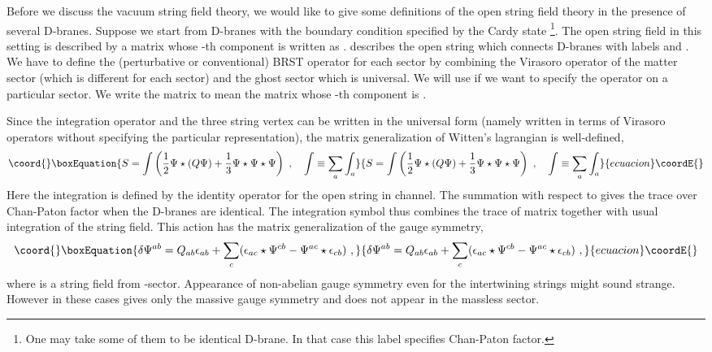 \documentclass[a4paper,12pt]{article}
\begin{document}
Before we discuss the vacuum string field theory, we would
like to give some definitions of the open string field theory
in the presence of several D-branes.  
Suppose we start from \coordHE{} D-branes with the boundary condition
specified by the Cardy  state \coordHE{}  \coordHE{}\footnote{
One may take some of them to be identical D-brane. In that case
this label specifies Chan-Paton factor.}.
The open string field in this setting is described by
a \coordHE{} matrix \myHighlight{$\Psi$}\coordHE{} whose \coordHE{}-th component is
written as \coordHE{}. \coordHE{} describes the 
open string which connects D-branes  with labels \coordHE{} and \coordHE{}.
We have to define the (perturbative or conventional)
BRST operator \coordHE{} for each sector by combining the Virasoro operator
of the matter sector (which is different 
for each sector) and the ghost sector which is universal.
We will use \coordHE{} if we want to specify the operator
on a particular sector. We write the matrix \coordHE{} 
to mean the matrix whose \coordHE{}-th component is
\coordHE{}.

Since the integration operator and the three string vertex 
can be written in the universal form \cite{r-RZ} 
(namely written in terms of Virasoro operators without 
specifying the particular  representation), the matrix
generalization of Witten's lagrangian is well-defined,
\begin{equation}\coord{}\boxEquation{
 S=\int \left(\frac{1}{2}\Psi \star(Q \Psi) + 
\frac{1}{3} \Psi\star\Psi\star\Psi
\right)\,\,,\quad
\int\equiv \sum_a \int_a
}{
 S=\int \left(\frac{1}{2}\Psi \star(Q \Psi) + 
\frac{1}{3} \Psi\star\Psi\star\Psi
\right)\,\,,\quad
\int\equiv \sum_a \int_a
}{ecuacion}\coordE{}\end{equation}
Here the integration \coordHE{}
is defined by the identity operator for the open string
in \coordHE{} channel. The summation with respect to 
\coordHE{} gives the trace over Chan-Paton factor
when the D-branes are identical. 
The integration symbol \myHighlight{$\int$}\coordHE{} thus combines the trace of
matrix together with usual integration of the string field.
This action has the matrix generalization of the gauge symmetry,
\begin{equation}\coord{}\boxEquation{
 \delta \Psi^{ab}=Q_{ab} \epsilon_{ab} 
 + \sum_c (\epsilon_{ac}\star \Psi^{cb}-
\Psi^{ac}\star\epsilon_{cb})\,\,,
}{
 \delta \Psi^{ab}=Q_{ab} \epsilon_{ab} 
 + \sum_c (\epsilon_{ac}\star \Psi^{cb}-
\Psi^{ac}\star\epsilon_{cb})\,\,,
}{ecuacion}\coordE{}\end{equation}
where \coordHE{} is a string field from \coordHE{}-sector.
Appearance of non-abelian gauge symmetry even for 
the intertwining strings might sound strange.  
However in these cases
\coordHE{} gives only the massive gauge
symmetry and does not appear in the massless sector.
\end{document}
